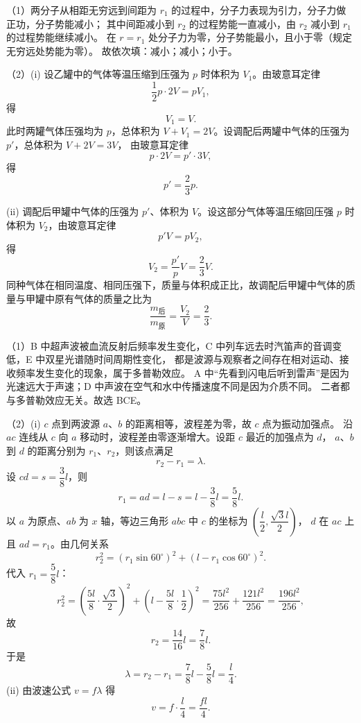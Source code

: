 \begin{answer}
（1）两分子从相距无穷远到间距为 $r_1$ 的过程中，分子力表现为引力，分子力做正功，分子势能减小；
其中间距减小到 $r_2$ 的过程势能一直减小，由 $r_2$ 减小到 $r_1$ 的过程势能继续减小。
在 $r=r_1$ 处分子力为零，分子势能最小，且小于零（规定无穷远处势能为零）。
故依次填：减小；减小；小于。

（2）(i) 设乙罐中的气体等温压缩到压强为 $p$ 时体积为 $V_1$。由玻意耳定律
\[
  \frac{1}{2}p\cdot 2V=pV_1,
\]
得
\[
  V_1=V.
\]
此时两罐气体压强均为 $p$，总体积为 $V+V_1=2V$。设调配后两罐中气体的压强为 $p'$，总体积为 $V+2V=3V$，
由玻意耳定律
\[
  p\cdot 2V=p'\cdot 3V,
\]
得
\[
  p'=\frac{2}{3}p.
\]

(ii) 调配后甲罐中气体的压强为 $p'$、体积为 $V$。设这部分气体等温压缩回压强 $p$ 时体积为 $V_2$，由玻意耳定律
\[
  p'V=pV_2,
\]
得
\[
  V_2=\frac{p'}{p}V=\frac{2}{3}V.
\]
同种气体在相同温度、相同压强下，质量与体积成正比，故调配后甲罐中气体的质量与甲罐中原有气体的质量之比为
\[
  \frac{m_{\text{后}}}{m_{\text{原}}}=\frac{V_2}{V}=\frac{2}{3}.
\]
\end{answer}

\begin{answer}
（1）B 中超声波被血流反射后频率发生变化，C 中列车远去时汽笛声的音调变低，E 中双星光谱随时间周期性变化，
都是波源与观察者之间存在相对运动、接收频率发生变化的现象，属于多普勒效应。
A 中“先看到闪电后听到雷声”是因为光速远大于声速；D 中声波在空气和水中传播速度不同是因为介质不同。
二者都与多普勒效应无关。故选 BCE。

（2）(i) $c$ 点到两波源 $a$、$b$ 的距离相等，波程差为零，故 $c$ 点为振动加强点。
沿 $ac$ 连线从 $c$ 向 $a$ 移动时，波程差由零逐渐增大。设距 $c$ 最近的加强点为 $d$，
$a$、$b$ 到 $d$ 的距离分别为 $r_1$、$r_2$，则该点满足
\[
  r_2-r_1=\lambda.
\]
设 $cd=s=\dfrac{3}{8}l$，则
\[
  r_1=ad=l-s=l-\frac{3}{8}l=\frac{5}{8}l.
\]
以 $a$ 为原点、$ab$ 为 $x$ 轴，等边三角形 $abc$ 中 $c$ 的坐标为 $\left(\dfrac{l}{2},\dfrac{\sqrt{3}l}{2}\right)$，
$d$ 在 $ac$ 上且 $ad=r_1$。由几何关系
\[
  r_2^{2}=(r_1\sin60^{\circ})^{2}+(l-r_1\cos60^{\circ})^{2}.
\]
代入 $r_1=\dfrac{5}{8}l$：
\[
  r_2^{2}=\left(\frac{5l}{8}\cdot\frac{\sqrt{3}}{2}\right)^{2}
          +\left(l-\frac{5l}{8}\cdot\frac{1}{2}\right)^{2}
         =\frac{75l^{2}}{256}+\frac{121l^{2}}{256}
         =\frac{196l^{2}}{256},
\]
故
\[
  r_2=\frac{14}{16}l=\frac{7}{8}l.
\]
于是
\[
  \lambda=r_2-r_1=\frac{7}{8}l-\frac{5}{8}l=\frac{l}{4}.
\]
(ii) 由波速公式 $v=f\lambda$ 得
\[
  v=f\cdot\frac{l}{4}=\frac{fl}{4}.
\]
\end{answer}
